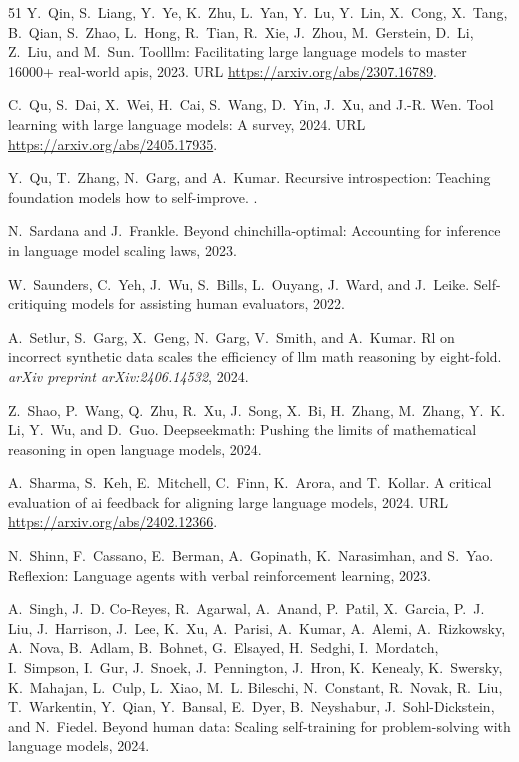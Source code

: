 \begin{thebibliography}{51}
Y.~Qin, S.~Liang, Y.~Ye, K.~Zhu, L.~Yan, Y.~Lu, Y.~Lin, X.~Cong, X.~Tang, B.~Qian, S.~Zhao, L.~Hong, R.~Tian, R.~Xie, J.~Zhou, M.~Gerstein, D.~Li, Z.~Liu, and M.~Sun.
\newblock Toolllm: Facilitating large language models to master 16000+ real-world apis, 2023.
\newblock URL \url{https://arxiv.org/abs/2307.16789}.

C.~Qu, S.~Dai, X.~Wei, H.~Cai, S.~Wang, D.~Yin, J.~Xu, and J.-R. Wen.
\newblock Tool learning with large language models: A survey, 2024{}.
\newblock URL \url{https://arxiv.org/abs/2405.17935}.

Y.~Qu, T.~Zhang, N.~Garg, and A.~Kumar.
\newblock Recursive introspection: Teaching foundation models how to self-improve.
.

N.~Sardana and J.~Frankle.
\newblock Beyond chinchilla-optimal: Accounting for inference in language model scaling laws, 2023.

W.~Saunders, C.~Yeh, J.~Wu, S.~Bills, L.~Ouyang, J.~Ward, and J.~Leike.
\newblock Self-critiquing models for assisting human evaluators, 2022.

A.~Setlur, S.~Garg, X.~Geng, N.~Garg, V.~Smith, and A.~Kumar.
\newblock Rl on incorrect synthetic data scales the efficiency of llm math reasoning by eight-fold.
\newblock \emph{arXiv preprint arXiv:2406.14532}, 2024.

Z.~Shao, P.~Wang, Q.~Zhu, R.~Xu, J.~Song, X.~Bi, H.~Zhang, M.~Zhang, Y.~K. Li, Y.~Wu, and D.~Guo.
\newblock Deepseekmath: Pushing the limits of mathematical reasoning in open language models, 2024.

A.~Sharma, S.~Keh, E.~Mitchell, C.~Finn, K.~Arora, and T.~Kollar.
\newblock A critical evaluation of ai feedback for aligning large language models, 2024.
\newblock URL \url{https://arxiv.org/abs/2402.12366}.

N.~Shinn, F.~Cassano, E.~Berman, A.~Gopinath, K.~Narasimhan, and S.~Yao.
\newblock Reflexion: Language agents with verbal reinforcement learning, 2023.

A.~Singh, J.~D. Co-Reyes, R.~Agarwal, A.~Anand, P.~Patil, X.~Garcia, P.~J. Liu, J.~Harrison, J.~Lee, K.~Xu, A.~Parisi, A.~Kumar, A.~Alemi, A.~Rizkowsky, A.~Nova, B.~Adlam, B.~Bohnet, G.~Elsayed, H.~Sedghi, I.~Mordatch, I.~Simpson, I.~Gur, J.~Snoek, J.~Pennington, J.~Hron, K.~Kenealy, K.~Swersky, K.~Mahajan, L.~Culp, L.~Xiao, M.~L. Bileschi, N.~Constant, R.~Novak, R.~Liu, T.~Warkentin, Y.~Qian, Y.~Bansal, E.~Dyer, B.~Neyshabur, J.~Sohl-Dickstein, and N.~Fiedel.
\newblock Beyond human data: Scaling self-training for problem-solving with language models, 2024.


\end{thebibliography}

